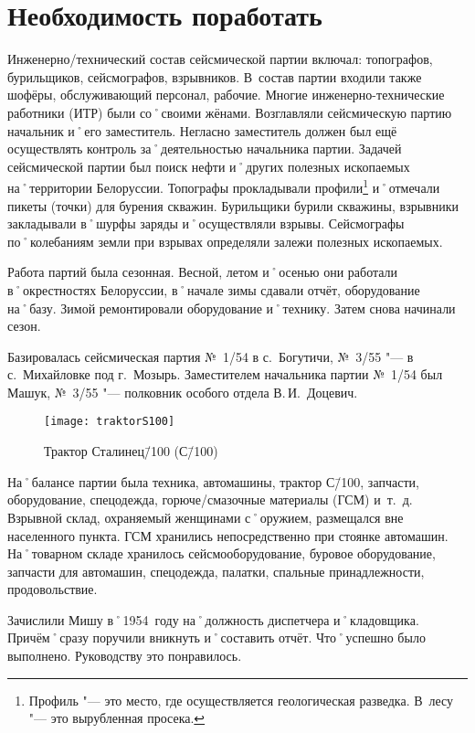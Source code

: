 ﻿\chapter{Необходимость поработать}

Инженерно\-/технический состав сейсмической партии включал: топографов, бурильщиков, сейсмографов, взрывников. В~состав партии входили также шофёры, обслуживающий персонал, рабочие. Многие инженерно-технические работники (ИТР) были со˚своими жёнами. Возглавляли сейсмическую партию начальник и˚его заместитель. Негласно заместитель должен был ещё осуществлять контроль за˚деятельностью начальника партии. Задачей сейсмической партии был поиск нефти и˚других полезных ископаемых на˚территории Белоруссии. Топографы прокладывали профили\footnote{Профиль "--- это место, где осуществляется геологическая разведка. В~лесу "--- это вырубленная просека.}  и˚отмечали пикеты (точки) для бурения скважин. Бурильщики бурили скважины, взрывники закладывали в˚шурфы заряды и˚осуществляли взрывы. Сейсмографы по˚колебаниям земли при взрывах определяли залежи полезных ископаемых.

Работа партий была сезонная. Весной, летом и˚осенью они работали в˚окрестностях Белоруссии, в˚начале зимы сдавали отчёт, оборудование на˚базу. Зимой ремонтировали оборудование и˚технику. Затем снова начинали сезон.

Базировалась сейсмическая партия №~1/54 в с.~Богутичи, №~3/55 "--- в с.~Михайловке под г.~Мозырь. Заместителем начальника партии №~1/54 был Машук, №~3/55 "--- полковник особого отдела В.\,И.~Доцевич.

\begin{wrapfigure}{O}{.4\textwidth}
\centering
\texttt{[image: traktorS100]}
\caption[Трактор Сталинец\=/100 (С\=/100)]{Трактор Сталинец\=/100 (С\=/100)\footnotemark}
\label{fig:traktorS100}
\end{wrapfigure}

На˚балансе партии была техника, автомашины, трактор С\=/100, запчасти, оборудование, спецодежда, горюче\-/смазочные материалы (ГСМ) и~т.~д. Взрывной склад, охраняемый женщинами с˚оружием, размещался вне населенного пункта. ГСМ хранились непосредственно при стоянке автомашин. На˚товарном складе хранилось сейсмооборудование, буровое оборудование, запчасти для автомашин, спецодежда, палатки, спальные принадлежности, продовольствие.

Зачислили Мишу в˚1954~году на˚должность диспетчера и˚кладовщика. Причём˚сразу поручили вникнуть и˚составить отчёт. Что˚успешно было выполнено. Руководству это понравилось.

